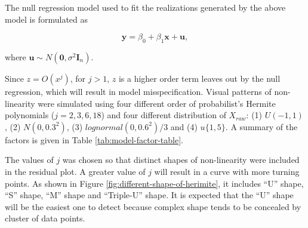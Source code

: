 \documentclass[]{interact}
\theoremstyle{plain}%
\theoremstyle{definition}
\theoremstyle{remark}
\begin{document}
The null regression model used to fit the realizations generated by the
above model is formulated as

\begin{equation} \label{eq:null-model}
\boldsymbol{y} = \beta_0 + \beta_1 \boldsymbol{x} + \boldsymbol{u},
\end{equation}

\noindent where
\(\boldsymbol{u} \sim N(\boldsymbol{0}, \sigma^2\boldsymbol{I}_n)\).

Since \(z = O(x^j)\), for \(j > 1\), \(z\) is a higher order term leaves
out by the null regression, which will result in model misspecification.
Visual patterns of non-linearity were simulated using four different
order of probabilist's Hermite polynomials (\(j = 2, 3, 6, 18\)) and
four different distribution of \(X_{raw}\): (1) \(U(-1, 1)\), (2)
\(N(0, 0.3^2)\), (3) \(lognormal(0, 0.6^2)/3\) and (4) \(u\{1, 5\}\). A
summary of the factors is given in Table \ref{tab:model-factor-table}.

\begin{table}

\caption{\label{tab:model-factor-table}Description of all factors involved in the non-linear and heteroskedasticity studies.}
\centering
{}
\end{table}

The values of \(j\) was chosen so that distinct shapes of non-linearity
were included in the residual plot. A greater value of \(j\) will result
in a curve with more turning points. As shown in Figure
\ref{fig:different-shape-of-herimite}, it includes ``U'' shape, ``S''
shape, ``M'' shape and ``Triple-U'' shape. It is expected that the ``U''
shape will be the easiest one to detect because complex shape tends to
be concealed by cluster of data points.
\end{document}

